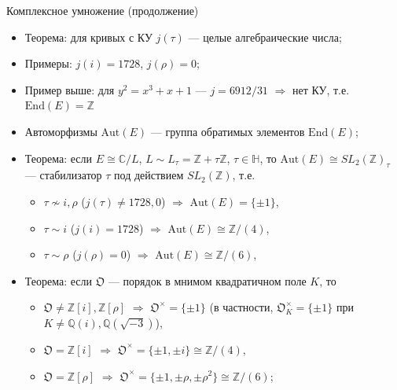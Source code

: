 \documentclass[serif, aspectratio=169]{beamer}
\begin{document}
\begin{frame}{Комплексное умножение (продолжение)}
    \begin{itemize}
        \item Теорема: для кривых с КУ $j(\tau)$ --- целые алгебраические числа; 
        \item Примеры: $j(i)=1728$, $j(\rho)=0$;
        \item Пример выше: для $y^2=x^3+x+1$ --- $j=6912/31$ $\Rightarrow$ нет КУ, т.е. $\mathrm{End}(E)=\mathbb{Z}$
        \item Автоморфизмы $\mathrm{Aut}(E)$ --- группа обратимых элементов $\mathrm{End}(E)$;
        \item Теорема: если $E\cong\mathbb{C}/L$, $L\sim L_\tau=\mathbb{Z}+\tau\mathbb{Z}$, $\tau\in\mathbb{H}$, то $\mathrm{Aut}(E)\cong SL_2(\mathbb{Z})_\tau$ --- стабилизатор $\tau$ под действием $SL_2(\mathbb{Z})$, т.е.
        \begin{itemize}
            \item $\tau \not\sim i, \rho$ ($j(\tau)\ne 1728, 0$) $\Rightarrow$ $\mathrm{Aut}(E)=\{\pm1\}$,
            \item $\tau  \sim i$ ($j(i)=1728$) $\Rightarrow$ $\mathrm{Aut}(E)\cong\mathbb{Z}/(4)$,
            \item $\tau  \sim \rho$ ($j(\rho)=0$) $\Rightarrow$ $\mathrm{Aut}(E)\cong\mathbb{Z}/(6)$,
        \end{itemize}
        \item Теорема: если $\mathfrak{O}$ --- порядок в мнимом квадратичном поле $K$, то
        \begin{itemize}
            \item $\mathfrak{O}\ne\mathbb{Z}[i],\mathbb{Z}[\rho]$ $\Rightarrow$ $\mathfrak{O}^\times=\{\pm1\}$ (в частности, $\mathfrak{O}_K^\times=\{\pm1\}$ при $K\ne\mathbb{Q}(i),\mathbb{Q}(\sqrt{-3})$),
            \item $\mathfrak{O}=\mathbb{Z}[i]$ $\Rightarrow$ $\mathfrak{O}^\times=\{\pm1,\pm i\}\cong\mathbb{Z}/(4)$,
            \item $\mathfrak{O}=\mathbb{Z}[\rho]$ $\Rightarrow$ $\mathfrak{O}^\times=\{\pm1,\pm\rho,\pm\rho^2\}\cong\mathbb{Z}/(6)$;
        \end{itemize}
    \end{itemize}
    \note{
        \begin{itemize}

\end{itemize}}
\end{frame}
\end{document}
